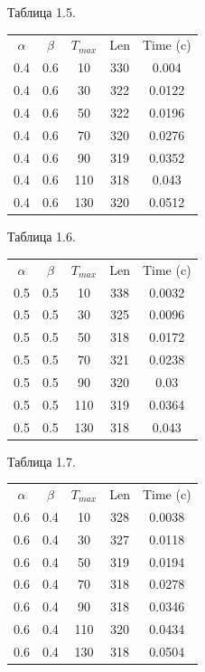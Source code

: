 \documentclass[12pt]{report}
\begin{document}
	\begin{minipage}{0.5\textwidth}
		\begin{center}
			Таблица 1.5.
			
			\begin{tabular}{|c c c c c|}
				\hline
				$\alpha$ & $\beta$ & $T_{max}$ & Len & Time (c) \\ [0.5ex]
				0.4 & 0.6 & 10 & 330 & 0.004 \\ 
				\hline 
				0.4 & 0.6 & 30 & 322 & 0.0122 \\ 
				\hline 
				0.4 & 0.6 & 50 & 322 & 0.0196 \\ 
				\hline 
				0.4 & 0.6 & 70 & 320 & 0.0276 \\ 
				\hline 
				0.4 & 0.6 & 90 & 319 & 0.0352 \\ 
				\hline 
				0.4 & 0.6 & 110 & 318 & 0.043 \\ 
				\hline 
				0.4 & 0.6 & 130 & 320 & 0.0512 \\ 
				\hline 
			\end{tabular}
			
			Таблица 1.6.
			
			\begin{tabular}{|c c c c c|}
				\hline
				$\alpha$ & $\beta$ & $T_{max}$ & Len & Time (c) \\ [0.5ex]
				0.5 & 0.5 & 10 & 338 & 0.0032 \\ 
				\hline 
				0.5 & 0.5 & 30 & 325 & 0.0096 \\ 
				\hline 
				0.5 & 0.5 & 50 & 318 & 0.0172 \\ 
				\hline 
				0.5 & 0.5 & 70 & 321 & 0.0238 \\ 
				\hline 
				0.5 & 0.5 & 90 & 320 & 0.03 \\ 
				\hline 
				0.5 & 0.5 & 110 & 319 & 0.0364 \\ 
				\hline 
				0.5 & 0.5 & 130 & 318 & 0.043 \\ 
				\hline 
			\end{tabular}
		
			Таблица 1.7.
			
			\begin{tabular}{|c c c c c|}
				\hline
				$\alpha$ & $\beta$ & $T_{max}$ & Len & Time (c) \\ [0.5ex]
				0.6 & 0.4 & 10 & 328 & 0.0038 \\ 
				\hline 
				0.6 & 0.4 & 30 & 327 & 0.0118 \\ 
				\hline 
				0.6 & 0.4 & 50 & 319 & 0.0194 \\ 
				\hline 
				0.6 & 0.4 & 70 & 318 & 0.0278 \\ 
				\hline 
				0.6 & 0.4 & 90 & 318 & 0.0346 \\ 
				\hline 
				0.6 & 0.4 & 110 & 320 & 0.0434 \\ 
				\hline 
				0.6 & 0.4 & 130 & 318 & 0.0504 \\ 
				\hline 
			\end{tabular}
		

\end{center}
\end{minipage}
\end{document}
